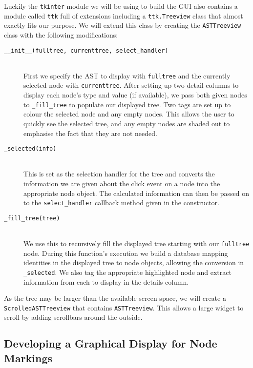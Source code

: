 \documentclass[twoside,a4paper]{report}
\begin{document}
Luckily the \texttt{tkinter} module we will be using to build the GUI also contains a module called \texttt{ttk} full of extensions including a
\texttt{ttk.Treeview} class that almost exactly fits our purpose. We will extend this class by creating the \texttt{ASTTreeview} class with the
following modifications:

\begin{description}
\item[\texttt{\_\_init\_\_(fulltree, currenttree, select\_handler)}] \hfill \\
First we specify the AST to display with \texttt{fulltree} and the currently selected node with \texttt{currenttree}. After setting up two detail columns
to display each node's type and value (if available), we pass both given nodes to \texttt{\_fill\_tree} to populate our displayed tree. Two tags are set
up to colour the selected node and any empty nodes. This allows the user to quickly see the selected tree, and any empty nodes are shaded out to emphasise
the fact that they are not needed.

\item[\texttt{\_selected(info)}] \hfill \\
This is set as the selection handler for the tree and converts the information we are given about the click event on a node into the appropriate node object.
The calculated information can then be passed on to the \texttt{select\_handler} callback method given in the constructor.

\item[\texttt{\_fill\_tree(tree)}] \hfill \\
We use this to recursively fill the displayed tree starting with our \texttt{fulltree} node. During this function's execution we build a database mapping
identities in the displayed tree to node objects, allowing the conversion in \texttt{\_selected}. We also tag the appropriate highlighted node and extract
information from each to display in the details column.
\end{description}

As the tree may be larger than the available screen space, we will create a \texttt{ScrolledASTTreeview} that contains \texttt{ASTTreeview}. This allows a
large widget to scroll by adding scrollbars around the outside.

\subsection{Developing a Graphical Display for Node Markings}
\end{document}
